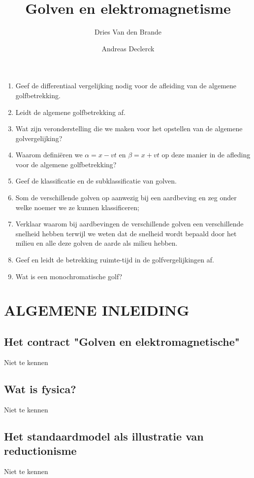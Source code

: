 \documentclass[12pt]{article}
\begin{document}
    
    \title{Golven en elektromagnetisme}
    \author{Dries Van den Brande \and Andreas Declerck}

    \maketitle
    \begin{enumerate}
        \item Geef de differentiaal vergelijking nodig voor de afleiding van de algemene golfbetrekking.
        \item Leidt de algemene golfbetrekking af.
        \item Wat zijn veronderstelling die we maken voor het opstellen van de algemene golvergelijking?
        \item Waarom defini\"eren we $\alpha = x - vt$ en $\beta = x + vt$ op deze manier in de afleding voor de algemene golfbetrekking?
        \item Geef de klassificatie en de subklassificatie van golven.
        \item Som de verschillende golven op aanwezig bij een aardbeving en zeg onder welke noemer we ze kunnen klassificeren;
        \item Verklaar waarom bij aardbevingen de verschillende golven een verschillende snelheid hebben terwijl we weten dat de snelheid wordt bepaald door het milieu en alle deze golven de aarde als milieu hebben.
        \item Geef en leidt de betrekking ruimte-tijd in de golfvergelijkingen af.
        \item Wat is een monochromatische golf? 
    \end{enumerate}

    \section{ALGEMENE INLEIDING}
    \subsection{Het contract "Golven en elektromagnetische"}
    Niet te kennen
    \subsection{Wat is fysica?}
    Niet te kennen
    \subsection{Het standaardmodel als illustratie van reductionisme}
    Niet te kennen
\end{document}
